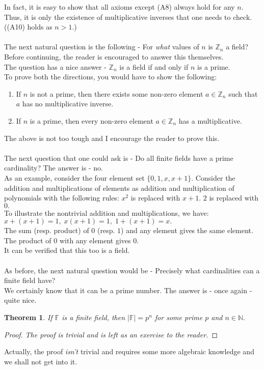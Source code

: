 \documentclass{article}
\newtheorem{theorem}{Theorem}
\begin{document}
In fact, it is easy to show that all axioms except (A8) always hold for any $n.$ Thus, it is only the existence of multiplicative inverses that one needs to check. ((A10) holds as $n > 1$.)\\~\\
The next natural question is the following - For \emph{what} values of $n$ is $\mathbb{Z}_n$ a field?\\
Before continuing, the reader is encouraged to answer this themselves. \\
The question has a nice answer - $\mathbb{Z}_n$ is a field if and only if $n$ is a prime.\\
To prove both the directions, you would have to show the following:
\begin{enumerate}[nosep] 
	\item If $n$ is not a prime, then there exists some non-zero element $a \in \mathbb{Z}_n$ such that $a$ has no multiplicative inverse.
	\item If $n$ is a prime, then every non-zero element $a \in \mathbb{Z}_n$ has a multiplicative.
\end{enumerate}
The above is not too tough and I encourage the reader to prove this.\\~\\
%
The next question that one could ask is - Do all finite fields have a prime cardinality? The answer is - no.\\
As an example, consider the four element set $\{0, 1, x, x + 1\}.$ Consider the addition and multiplications of elements as addition and multiplication of polynomials with the following rules: $x^2$ is replaced with $x+1.$ $2$ is replaced with $0.$\\
To illustrate the nontrivial addition and multiplications, we have:\\
$x + (x + 1) = 1,\;x(x+1) = 1,\;1 + (x + 1) = x.$\\
The sum (resp. product) of $0$ (resp. $1$) and any element gives the same element. The product of $0$ with any element gives $0.$\\
It can be verified that this too is a field.\\~\\
As before, the next natural question would be - Precisely what cardinalities can a finite field have?\\
We certainly know that it can be a prime number. The answer is - once again - quite nice.
\begin{theorem} 
	If $\mathbb{F}$ is a finite field, then $|\mathbb{F}| = p^n$ for some prime $p$ and $n \in \mathbb{N}.$
\end{theorem}
\begin{proof} 
	\emph{The proof is trivial and is left as an exercise to the reader.}
\end{proof}
Actually, the proof \emph{isn't} trivial and requires some more algebraic knowledge and we shall not get into it.
\end{document}
